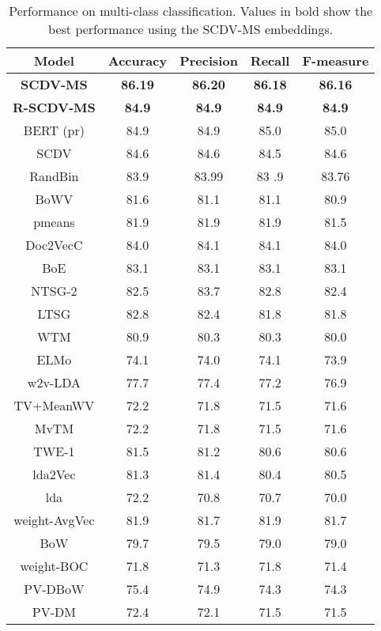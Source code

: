\documentclass{ecai}
\begin{document}
\begin{table}
\captionsetup{font=small, skip=0pt}
\caption{Performance on multi-class classification. Values in bold show the best performance using the SCDV-MS embeddings.}
\small
\begin{center}
\setlength\tabcolsep{2.5pt}
\begin{tabular}{ c|c|c|c|c } 
\hline
{\bf Model} & {\bf Accuracy} & {\bf Precision} & {\bf Recall} & {\bf F-measure} \\
\hline
\bf SCDV-MS &\bf 86.19 &\bf 86.20 &\bf 86.18 & \bf 86.16 \\
\bf R-SCDV-MS &\bf 84.9 &\bf 84.9 &\bf 84.9 &\bf 84.9\\
BERT (pr)\cite{devlin2018bert} & 84.9 & 84.9 & 85.0 & 85.0\\
SCDV \cite{mekala2017scdv} & 84.6 & 84.6 &84.5  & 84.6 \\
RandBin & 83.9 & 83.99 & 83 .9 & 83.76\\
BoWV \cite{vivek} & 81.6 & 81.1 & 81.1 & 80.9\\
pmeans \cite{pmeans} & 81.9 & 81.9 & 81.9 & 81.5\\
Doc2VecC \cite{chen2017efficient}& 84.0 & 84.1 & 84.1 & 84.0\\
BoE \cite{boe} & 83.1 & 83.1 & 83.1 & 83.1 \\
NTSG-2 \cite{liu2015learning} & 82.5 & 83.7 & 82.8 & 82.4\\
LTSG \cite{ltsg} & 82.8 & 82.4 & 81.8 & 81.8\\
WTM \cite{wtm}& 80.9 & 80.3 & 80.3 & 80.0\\
ELMo \cite{elmo}& 74.1 & 74.0 & 74.1 & 73.9\\
w2v-LDA \cite{wtvlda} & 77.7 & 77.4 & 77.2 & 76.9\\
TV+MeanWV \cite{tvMeanWV} & 72.2 & 71.8 & 71.5 & 71.6\\
MvTM \cite{mvtm}& 72.2 & 71.8 & 71.5 & 71.6\\
TWE-1 \cite{AAAI159314} & 81.5 & 81.2 & 80.6 & 80.6\\
lda2Vec \cite{lda2vec} & 81.3 & 81.4 & 80.4 & 80.5\\
lda \cite{Blei:2003} & 72.2 & 70.8 & 70.7 & 70.0\\
weight-AvgVec \cite{pranjal2015weighted} &  81.9 & 81.7 & 81.9 & 81.7\\
BoW \cite{pranjal2015weighted} & 79.7 & 79.5 & 79.0 & 79.0\\
weight-BOC \cite{pranjal2015weighted} & 71.8 & 71.3 & 71.8 & 71.4\\
PV-DBoW \cite{le2014distributed}& 75.4 & 74.9 & 74.3 & 74.3 \\
PV-DM \cite{le2014distributed}& 72.4 & 72.1 & 71.5 & 71.5 \\ 
\hline
\end{tabular}
\end{center}
\label{table:1}
\vspace{-0.95em}
\end{table}
\end{document}
